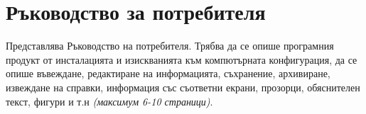 \chapter{Ръководство за потребителя}

Представлява Ръководство на потребителя. Трябва да се опише програмния продукт от инсталацията и изискванията към компютърната конфигурация, да се опише въвеждане, редактиране на информацията, съхранение, архивиране, извеждане на справки, информация със съответни екрани, прозорци, обяснителен текст, фигури и т.н \emph{(максимум 6-10 страници)}. 